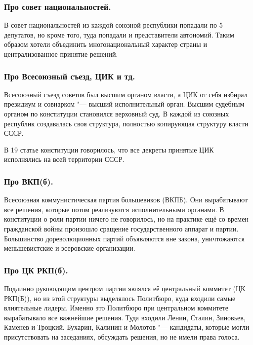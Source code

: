 \subsubsection{\textbf{Про совет национальностей.}}

В совет национальностей из каждой союзной республики попадали по 5 депутатов, но кроме того, туда попадали и представители автономий. Таким образом хотели объединить многонациональный характер страны и централизованное принятие решений.

\subsubsection{\textbf{Про Всесоюзный съезд, ЦИК и тд.}}

Всесоюзный съезд советов был высшим органом власти, а ЦИК от себя избирал президиум и совнарком "--- высший исполнительный орган. Высшим судебным органом по конституции становился верховный суд. В каждой из союзных республик создавалась своя структура, полностью копирующая структуру власти СССР.

В 19 статье конституции говорилось, что все декреты принятые ЦИК исполнялись на всей территории СССР.

\subsubsection{\textbf{Про ВКП(б).}}

Всесоюзная коммунистическая партия большевиков (ВКПБ). Они вырабатывают все решения, которые потом реализуются исполнительными органами. В конституции о роли партии ничего не говорилось, но на практике ещё со времен гражданской войны произошло сращение государственного аппарат и партии. Большинство дореволюционных партий объявляются вне закона, уничтожаются меньшевистские и эсеровские организации.

\subsubsection{\textbf{Про ЦК РКП(б).}}

Подлинно руководящим центром партии являлся её центральный коммитет (ЦК РКП(Б)), но из этой структуры выделялось Политбюро, куда входили самые влиятельные лидеры. Именно это Политбюро при центральном коммитете вырабатывало все важнейшие решения. Туда входили Ленин, Сталин, Зиновьев, Каменев и Троцкий. Бухарин, Калинин и Молотов "--- кандидаты, которые могли присутствовать на заседаниях, обсуждать решения, но не имели права голоса.


